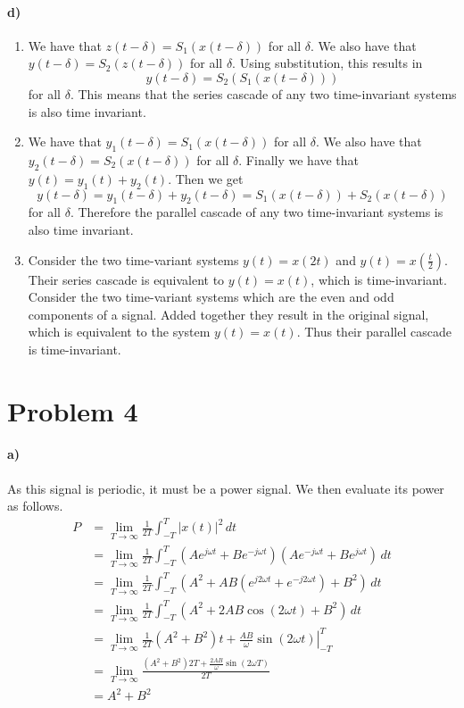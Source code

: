 \documentclass[12pt]{article}
\begin{document}
\pagebreak

\paragraph{d)}

\begin{enumerate}
	\item We have that \(z(t-\delta)=S_1(x(t-\delta))\) for all \(\delta\). We also have that \(y(t-\delta)=S_2(z(t-\delta))\) for all \(\delta\).
	Using substitution, this results in
	\[y(t-\delta)=S_2(S_1(x(t-\delta)))\]
	for all \(\delta\). This means that the series cascade of any two time-invariant systems is also time invariant.
	\item We have that \(y_1(t-\delta)=S_1(x(t-\delta))\) for all \(\delta\). We also have that \(y_2(t-\delta)=S_2(x(t-\delta))\) for all \(\delta\).
	Finally we have that \(y(t)=y_1(t)+y_2(t)\). Then we get
	\[y(t-\delta)=y_1(t-\delta)+y_2(t-\delta)=S_1(x(t-\delta))+S_2(x(t-\delta))\]
	for all \(\delta\). Therefore the parallel cascade of any two time-invariant systems is also time invariant.
	\item Consider the two time-variant systems \(y(t)=x(2t)\) and \(y(t)=x\left(\frac{t}{2}\right)\). Their series cascade is equivalent to \(y(t)=x(t)\), which is time-invariant.
	Consider the two time-variant systems which are the even and odd components of a signal. Added together they result in the original signal, which is equivalent
	to the system \(y(t)=x(t)\). Thus their parallel cascade is time-invariant.
\end{enumerate}

\section*{Problem 4}

\paragraph{a)}

As this signal is periodic, it must be a power signal. We then evaluate its power as follows.
\begin{align*}
	P&=\lim_{T\to\infty} \frac{1}{2T}\int_{-T}^T |x(t)|^2\,dt\\
	&=\lim_{T\to\infty} \frac{1}{2T}\int_{-T}^T (Ae^{j\omega t}+Be^{-j\omega t})(Ae^{-j\omega t}+Be^{j\omega t})\,dt\\
	&=\lim_{T\to\infty} \frac{1}{2T}\int_{-T}^T (A^2+AB(e^{j2\omega t}+e^{-j2\omega t})+B^2)\,dt\\
	&=\lim_{T\to\infty} \frac{1}{2T}\int_{-T}^T (A^2+2AB\cos(2\omega t)+B^2)\,dt\\
	&=\lim_{T\to\infty} \frac{1}{2T}\left.(A^2+B^2)t + \frac{AB}{\omega}\sin(2\omega t)\right|_{-T}^T\\
	&=\lim_{T\to\infty} \frac{(A^2+B^2)2T+\frac{2AB}{\omega}\sin(2\omega T)}{2T}\\
	&=A^2+B^2
\end{align*}
\end{document}
